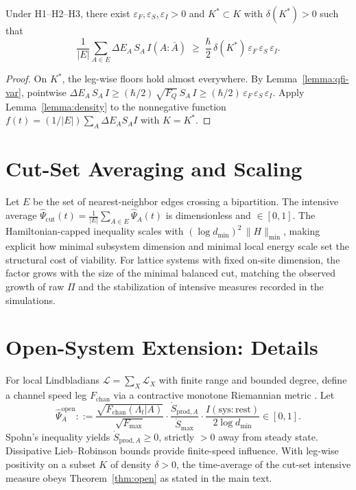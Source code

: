 \documentclass[10pt]{article}
\begin{document}
\begin{theorem*}
Under H1–H2–H3, there exist \(\varepsilon_F,\varepsilon_S,\varepsilon_I>0\) and \(K^*\subset K\) with \(\delta(K^*)>0\) such that
\[
\frac{1}{|E|}\sum_{A\in E} \Delta E_A\,S_A\,I(A{:}\bar A)\;\ge\; \frac{\hbar}{2}\,\delta(K^*)\,\varepsilon_F\,\varepsilon_S\,\varepsilon_I.
\]
\end{theorem*}
\begin{proof}
On \(K^*\), the leg-wise floors hold almost everywhere. By Lemma~\ref{lemma:qfi-var}, pointwise \(\Delta E_A\,S_A\,I\ge (\hbar/2)\,\sqrt{F_Q}\,S_A\,I\ge (\hbar/2)\,\varepsilon_F\,\varepsilon_S\,\varepsilon_I\). Apply Lemma~\ref{lemma:density} to the nonnegative function \(f(t)=(1/|E|)\sum_A \Delta E_A S_A I\) with \(K=K^*\).
\end{proof}

\section{Cut-Set Averaging and Scaling}
Let \(E\) be the set of nearest-neighbor edges crossing a bipartition. The intensive average
\(\widehat{\Psi}_{\mathrm{cut}}(t)=\tfrac{1}{|E|}\sum_{A\in E}\widehat{\Psi}_A(t)\) is dimensionless and \(\in[0,1]\).
The Hamiltonian-capped inequality scales with \((\log d_{\min})^2\,\lVert H\rVert_{\min}\), making explicit how minimal subsystem dimension and minimal local energy scale set the structural cost of viability. For lattice systems with fixed on-site dimension, the factor grows with the size of the minimal balanced cut, matching the observed growth of raw \(\Pi\) and the stabilization of intensive measures recorded in the simulations.

\section{Open-System Extension: Details}
For local Lindbladians \(\mathcal L=\sum_X\mathcal L_X\) with finite range and bounded degree, define a channel speed leg \(F_{\mathrm{chan}}\) via a contractive monotone Riemannian metric \cite{Petz1996}. Let
\[
\widehat{\Psi}^{\mathrm{open}}_A
::= \frac{\sqrt{F_{\mathrm{chan}}(\Lambda_t|A)}}{\sqrt{F_{\max}}}
\cdot \frac{\dot S_{\mathrm{prod},A}}{\dot S_{\max}}\cdot\frac{I(\mathrm{sys}{:}\mathrm{rest})}{2\log d_{\min}}\in[0,1].
\]
Spohn’s inequality \cite{Spohn1978} yields \(\dot S_{\mathrm{prod},A}\ge 0\), strictly \(>0\) away from steady state. Dissipative Lieb–Robinson bounds provide finite-speed influence. With leg-wise positivity on a subset \(K\) of density \(\delta>0\), the time-average of the cut-set intensive measure obeys Theorem~\ref{thm:open} as stated in the main text.
\end{document}
